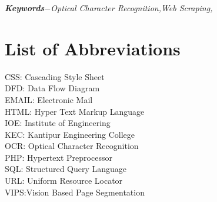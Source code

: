 \par
\textbf{\textit{Keywords$-$}}{\textit{Optical Character Recognition,}}{\textit{Web Scraping,}} 

\par

{
\KECadjusttocspacings %
\makeatletter
\def\@makeschapterhead#1{%
  {\newpage \parindent \z@ \raggedright
    \normalfont
    \interlinepenalty\@M
    \center \fontsize{16pt}{1} \bfseries \MakeUppercase{#1}\par\nobreak
    \vskip 18\p@ %
  }}
\makeatother 

\tableofcontents %
\listoffigures %


\chapter*{List of Abbreviations}
	CSS:  Cascading Style Sheet\\
	DFD: Data Flow Diagram\\
	EMAIL: Electronic Mail\\
	HTML: Hyper Text Markup Language\\
	IOE: Institute of Engineering\\
	KEC: Kantipur Engineering College\\
	OCR: Optical Character Recognition \\
	PHP: Hypertext Preprocessor\\
	SQL: Structured Query Language\\
	URL: Uniform Resource Locator\\
	VIPS:Vision Based Page Segmentation

	
	
}

